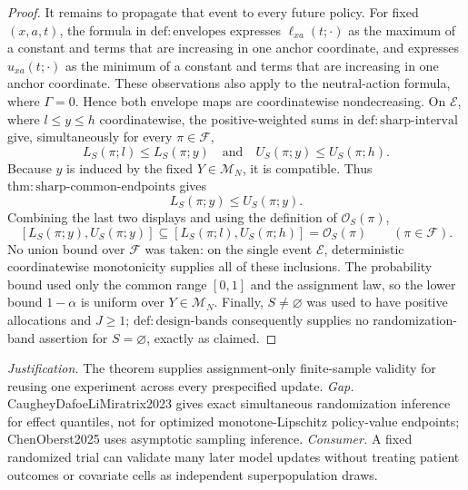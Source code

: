 \documentclass{article}
\begin{document}
\begin{proof}
It remains to propagate that event to every future policy.  For fixed \((x,a,t)\), the formula in \(\mathrm{def{:}envelopes}\) expresses \(\ell_{xa}(t;\cdot)\) as the maximum of a constant and terms that are increasing in one anchor coordinate, and expresses \(u_{xa}(t;\cdot)\) as the minimum of a constant and terms that are increasing in one anchor coordinate.  These observations also apply to the neutral-action formula, where \(\Gamma=0\).  Hence both envelope maps are coordinatewise nondecreasing.  On \(\mathcal E\), where \(l\leq y\leq h\) coordinatewise, the positive-weighted sums in \(\mathrm{def{:}sharp\text{-}interval}\) give, simultaneously for every \(\pi\in\mathcal F\),
\[
L_S(\pi;l)\leq L_S(\pi;y)
\quad\text{and}\quad
U_S(\pi;y)\leq U_S(\pi;h).
\]
Because \(y\) is induced by the fixed \(Y\in\mathcal M_N\), it is compatible.  Thus \(\mathrm{thm{:}sharp\text{-}common\text{-}endpoints}\) gives
\[
L_S(\pi;y)\leq U_S(\pi;y).
\]
Combining the last two displays and using the definition of \(\mathcal O_S(\pi)\),
\[
[L_S(\pi;y),U_S(\pi;y)]
\subseteq
[L_S(\pi;l),U_S(\pi;h)]
=\mathcal O_S(\pi)
\qquad(\pi\in\mathcal F).
\]
No union bound over \(\mathcal F\) was taken: on the single event \(\mathcal E\), deterministic coordinatewise monotonicity supplies all of these inclusions.  The probability bound used only the common range \([0,1]\) and the assignment law, so the lower bound \(1-\alpha\) is uniform over \(Y\in\mathcal M_N\).  Finally, \(S\neq\varnothing\) was used to have positive allocations and \(J\geq1\); \(\mathrm{def{:}design\text{-}bands}\) consequently supplies no randomization-band assertion for \(S=\varnothing\), exactly as claimed.
\end{proof}
\par\smallskip\noindent \textit{Justification.} The theorem supplies assignment-only finite-sample validity for reusing one experiment across every prespecified update. \textit{Gap.} CaugheyDafoeLiMiratrix2023 gives exact simultaneous randomization inference for effect quantiles, not for optimized monotone-Lipschitz policy-value endpoints; ChenOberst2025 uses asymptotic sampling inference. \textit{Consumer.} A fixed randomized trial can validate many later model updates without treating patient outcomes or covariate cells as independent superpopulation draws.
\end{document}
